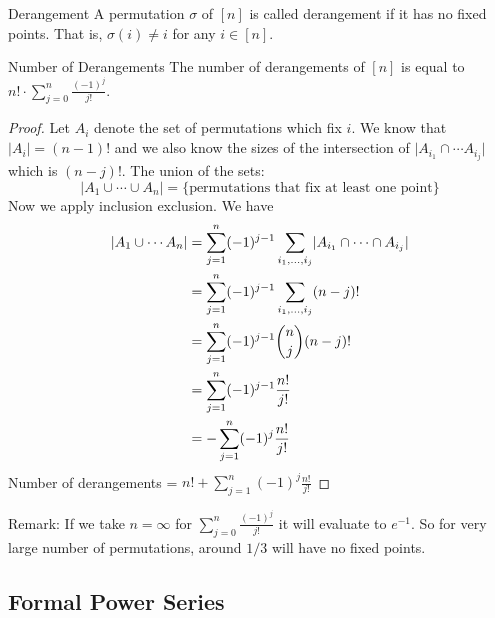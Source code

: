 \documentclass{report}
\begin{document}
\begin{definition}{Derangement}
    A permutation $\sigma$ of $[n]$ is called derangement if it has no fixed points. That is, $\sigma(i) \neq i$ for any $i \in [n]$.
\end{definition}

\begin{theorem}{Number of Derangements}
    The number of derangements of $[n]$ is equal to $n! \cdot \sum_{j = 0}^{n} \frac{(-1)^{j}}{j!}$.
\end{theorem}
    \begin{proof}
        Let $A_{i}$ denote the set of permutations which fix $i$. We know that $\lvert A_{i} \rvert = (n - 1)!$ and we also know the sizes of the intersection of $\lvert A_{i_{1}} \cap \cdots A_{i_{j}} \rvert$ which is $(n - j)!$. The union of the sets:
            \begin{equation*}
                \lvert A_{1} \cup \cdots \cup A_{n} \rvert = \{\text{permutations that fix at least one point}\}
            \end{equation*}
        Now we apply inclusion exclusion. We have
            \begin{align*}
                \lvert A_{1} \cup \cdots A_{n} \rvert &= \sum_{j = 1}^{n} (-1)^{j - 1}\sum_{i_{1}, \ldots , i_{j}}^{} \lvert A_{i_{1}} \cap \cdots \cap A_{i_{j}} \rvert \\
                                                      &= \sum_{j = 1}^{n} (-1)^{j - 1}\sum_{i_{1}, \ldots , i_{j}}^{} (n - j)!                                           \\
                                                      &= \sum_{j = 1}^{n} (-1)^{j - 1}\dbinom{n}{j}(n - j)! \\
                                                      &= \sum_{j = 1}^{n} (-1)^{j - 1}\dfrac{n!}{j!} \\
                                                      &= -\sum_{j = 1}^{n} (-1)^{j} \dfrac{n!}{j!}
            \end{align*}
        Number of derangements = $n! + \sum_{j = 1}^{n} (-1)^{j}\frac{n!}{j!}$
    \end{proof}

Remark: If we take $n = \infty$ for $\sum_{j = 0}^{n} \frac{(-1)^{j}}{j!}$ it will evaluate to $e^{-1}$. So for very large number of permutations, around $1/3$ will have no fixed points.

\begin{topic}
    \section{Formal Power Series}
\end{topic}
\end{document}
